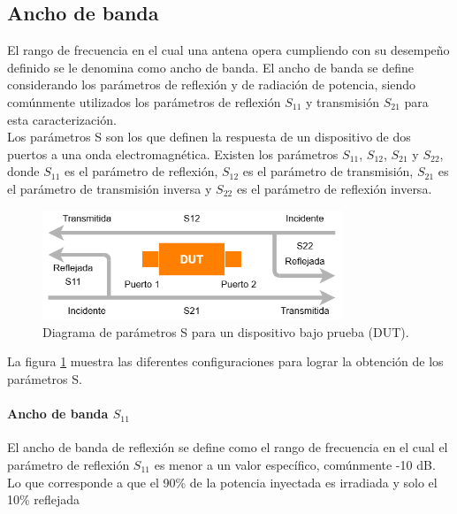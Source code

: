 \subsection{Ancho de banda}

El rango de frecuencia en el cual una antena opera cumpliendo con su desempeño definido se le denomina como ancho de banda. El ancho de banda se define considerando los parámetros de reflexión y de radiación de potencia, siendo comúnmente utilizados los parámetros de reflexión $S_{11}$ y transmisión $S_{21}$ para esta caracterización.\\

Los parámetros S son los que definen la respuesta de un dispositivo de dos puertos a una onda electromagnética. Existen los parámetros $S_{11}$, $S_{12}$, $S_{21}$ y $S_{22}$, donde $S_{11}$ es el parámetro de reflexión, $S_{12}$ es el parámetro de transmisión, $S_{21}$ es el parámetro de transmisión inversa y $S_{22}$ es el parámetro de reflexión inversa.\\

\begin{figure}
    \centering
    \includegraphics[width = 0.8\textwidth]{img/bloquesS.png}
    \caption{Diagrama de parámetros S para un dispositivo bajo prueba (DUT).}
    \label{fig:sparam}
\end{figure}

La figura \ref{fig:sparam} muestra las diferentes configuraciones para lograr la obtención de los parámetros S.\\

\paragraph{Ancho de banda $S_{11}$} El ancho de banda de reflexión se define como el rango de frecuencia en el cual el parámetro de reflexión $S_{11}$ es menor a un valor específico, comúnmente -10 dB. Lo que corresponde a que el 90\% de la potencia inyectada es irradiada y solo el 10\% reflejada\\

